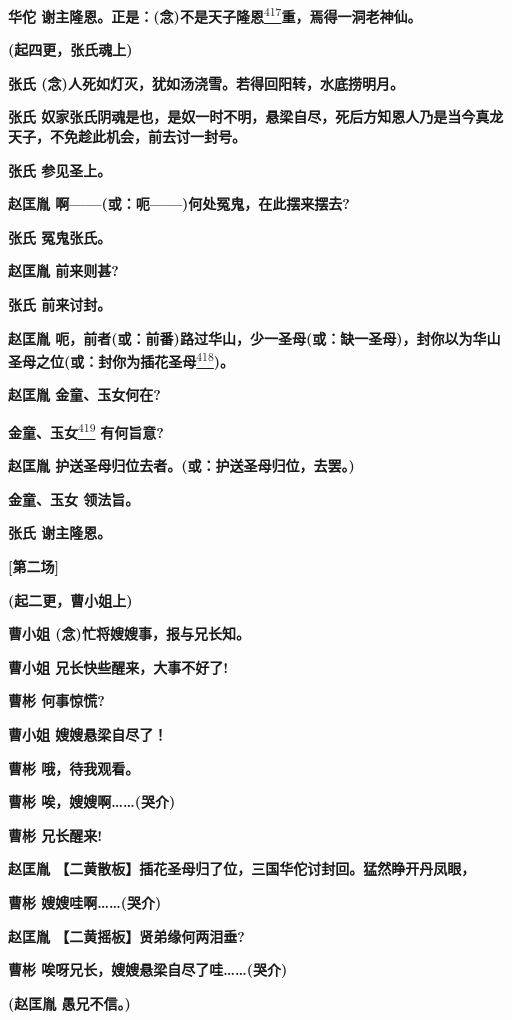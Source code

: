 \textbf{华佗
谢主隆恩。正是：(念)不是天子隆恩}\protect\hyperlink{fn417}{\textsuperscript{417}}\textbf{重，焉得一洞老神仙。}

\textbf{(起四更，张氏魂上)}

\textbf{张氏 (念)人死如灯灭，犹如汤浇雪。若得回阳转，水底捞明月。}

\textbf{张氏
奴家张氏阴魂是也，是奴一时不明，悬梁自尽，死后方知恩人乃是当今真龙天子，不免趁此机会，前去讨一封号。}

\textbf{张氏 参见圣上。}

\textbf{赵匡胤 啊------(或：呃------)何处冤鬼，在此摆来摆去?}

\textbf{张氏 冤鬼张氏。}

\textbf{赵匡胤 前来则甚?}

\textbf{张氏 前来讨封。}

\textbf{赵匡胤
呃，前者(或：前番)路过华山，少一圣母(或：缺一圣母)，封你以为华山圣母之位(或：封你为插花圣母}\protect\hyperlink{fn418}{\textsuperscript{418}}\textbf{)。}

\textbf{赵匡胤 金童、玉女何在?}

\textbf{金童、玉女}\protect\hyperlink{fn419}{\textsuperscript{419}}
\textbf{有何旨意?}

\textbf{赵匡胤 护送圣母归位去者。(或：护送圣母归位，去罢。)}

\textbf{金童、玉女 领法旨。}

\textbf{张氏 谢主隆恩。}

\textbf{{[}第二场{]}}

\textbf{(起二更，曹小姐上)}

\textbf{曹小姐 (念)忙将嫂嫂事，报与兄长知。}

\textbf{曹小姐 兄长快些醒来，大事不好了!}

\textbf{曹彬 何事惊慌?}

\textbf{曹小姐 嫂嫂悬梁自尽了！}

\textbf{曹彬 哦，待我观看。}

\textbf{曹彬 唉，嫂嫂啊\ldots{}\ldots{}(哭介)}

\textbf{曹彬 兄长醒来!}

\textbf{赵匡胤
【二黄散板】插花圣母归了位，三国华佗讨封回。猛然睁开丹凤眼，}

\textbf{曹彬 嫂嫂哇啊\ldots{}\ldots{}(哭介)}

\textbf{赵匡胤 【二黄摇板】贤弟缘何两泪垂?}

\textbf{曹彬 唉呀兄长，嫂嫂悬梁自尽了哇\ldots{}\ldots{}(哭介)}

\textbf{(赵匡胤 愚兄不信。)}

